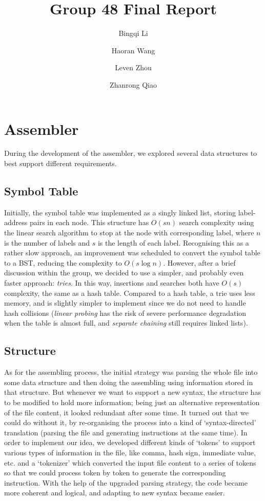 \documentclass[11pt]{article}
\begin{document}
\title{Group 48 Final Report}
\author{Bingqi Li \and Haoran Wang \and Leven Zhou \and Zhanrong Qiao}

\maketitle

\section{Assembler}

During the development of the assembler, we explored several data structures to best support different requirements.

\subsection{Symbol Table}

Initially, the symbol table was implemented as a singly linked list, storing label-address pairs in each node. This structure has $O(sn)$ search complexity using the linear search algorithm to stop at the node with corresponding label, where $n$ is the number of labels and $s$ is the length of each label. Recognising this as a rather slow approach, an improvement was scheduled to convert the symbol table to a BST, reducing the complexity to $O(s \log n)$. However, after a brief discussion within the group, we decided to use a simpler, and probably even faster approach: \textit{tries}. In this way, insertions and searches both have $O(s)$ complexity, the same as a hash table. Compared to a hash table, a trie uses less memory, and is slightly simpler to implement since we do not need to handle hash collisions (\textit{linear probing} has the risk of severe performance degradation when the table is almost full, and \textit{separate chaining} still requires linked lists).

\subsection{Structure}

As for the assembling process, the initial strategy was parsing the whole file into some data structure and then doing the assembling using information stored in that structure. But whenever we want to support a new syntax, the structure has to be modified to hold more information; being just an alternative representation of the file content, it looked redundant after some time. It turned out that we could do without it, by re-organising the process into a kind of ‘syntax-directed’ translation (parsing the file and generating instructions at the same time). In order to implement our idea, we developed different kinds of ‘tokens’ to support various types of information in the file, like comma, hash sign, immediate value, etc. and a ‘tokenizer’ which converted the input file content to a series of tokens so that we could process token by token to generate the corresponding instruction. With the help of the upgraded parsing strategy, the code became more coherent and logical, and adapting to new syntax became easier.
\end{document}
